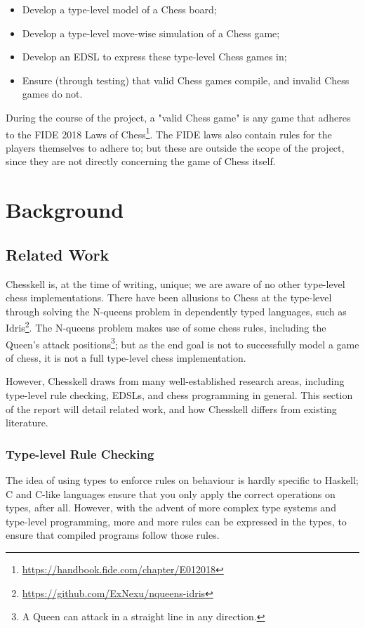 \documentclass[12pt, a4paper, bibliography=totocnumbered]{scrreprt}
\begin{document}
\begin{itemize}
    \item Develop a type-level model of a Chess board;
    \item Develop a type-level move-wise simulation of a Chess game;
    \item Develop an EDSL to express these type-level Chess games in;
    \item Ensure (through testing) that valid Chess games compile, and invalid Chess games do not.
\end{itemize}

During the course of the project, a "valid Chess game" is any game that adheres to the FIDE 2018 Laws of Chess\footnote{\url{https://handbook.fide.com/chapter/E012018}}. The FIDE laws also contain rules for the players themselves to adhere to; but these are outside the scope of the project, since they are not directly concerning the game of Chess itself.

\part{Background}

\chapter{Related Work}

Chesskell is, at the time of writing, unique; we are aware of no other type-level chess implementations. There have been allusions to Chess at the type-level through solving the N-queens problem in dependently typed languages, such as Idris\footnote{\url{https://github.com/ExNexu/nqueens-idris}}. The N-queens problem makes use of some chess rules, including the Queen's attack positions\footnote{A Queen can attack in a straight line in any direction.}; but as the end goal is not to successfully model a game of chess, it is not a full type-level chess implementation.

However, Chesskell draws from many well-established research areas, including type-level rule checking, EDSLs, and chess programming in general. This section of the report will detail related work, and how Chesskell differs from existing literature.

\section{Type-level Rule Checking}

The idea of using types to enforce rules on behaviour is hardly specific to Haskell; C and C-like languages ensure that you only apply the correct operations on types, after all. However, with the advent of more complex type systems and type-level programming, more and more rules can be expressed in the types, to ensure that compiled programs follow those rules.
\end{document}
